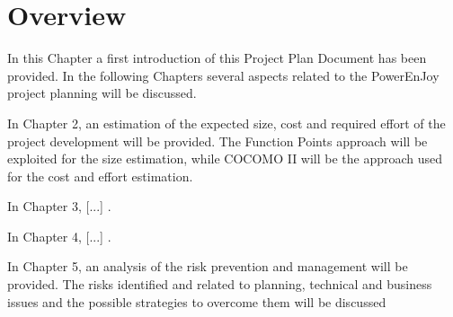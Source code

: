 \section{Overview}
In this Chapter a first introduction of this Project Plan Document has been provided. In the following Chapters several aspects related to the PowerEnJoy project planning will be discussed.

In Chapter 2, an estimation of the expected size, cost and required effort of the project development will be provided. The Function Points approach will be exploited for the size estimation, while COCOMO II will be the approach used for the cost and effort estimation.

In Chapter 3, [...] .

In Chapter 4, [...] .

In Chapter 5, an analysis of the risk prevention and management will be provided. The risks identified and related to planning, technical and business issues and the possible strategies to overcome them will be discussed 
